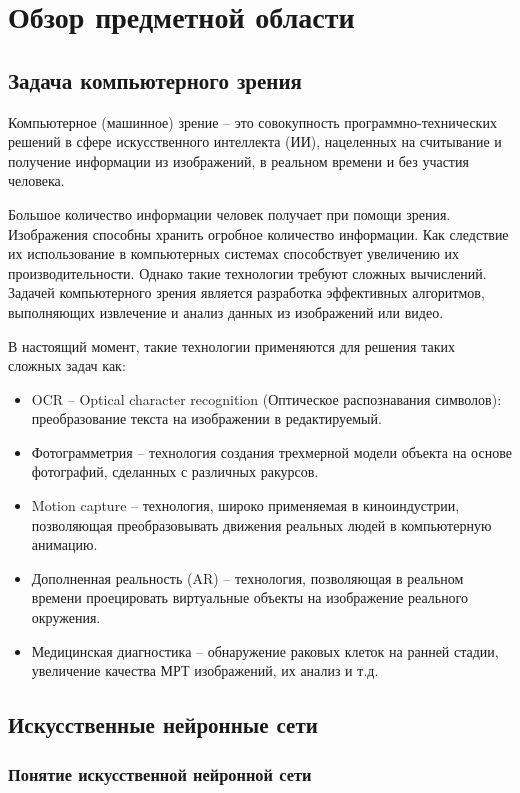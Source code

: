 \section{Обзор предметной области}
\subsection{Задача компьютерного зрения}
Компьютерное (машинное) зрение – это совокупность программно-технических решений в сфере искусственного интеллекта (ИИ), нацеленных на считывание и получение информации из изображений, в реальном времени и без участия человека. 

Большое количество информации человек получает при помощи зрения. 
Изображения способны хранить огробное количество информации. Как следствие их использование в компьютерных системах способствует увеличению их производительности. Однако такие технологии требуют сложных вычислений. Задачей компьютерного зрения является разработка эффективных алгоритмов, выполняющих извлечение и анализ данных из изображений или видео. 
 
В настоящий момент, такие технологии применяются для решения таких сложных задач как:
\begin{itemize}
    \item OCR – Optical character recognition (Оптическое распознавания символов): преобразование текста на изображении в редактируемый.
    \item Фотограмметрия – технология создания трехмерной модели объекта на основе фотографий, сделанных с различных ракурсов.
    \item Motion capture – технология, широко применяемая в киноиндустрии, позволяющая преобразовывать движения реальных людей в компьютерную анимацию.
    \item Дополненная реальность (AR) – технология, позволяющая в реальном времени проецировать виртуальные объекты на изображение реального окружения. 
    \item Медицинская диагностика – обнаружение раковых клеток на ранней стадии, увеличение качества МРТ изображений, их анализ и т.д.
\end{itemize}
\subsection{Искусственные нейронные сети}

\subsubsection{Понятие искусственной нейронной сети}

